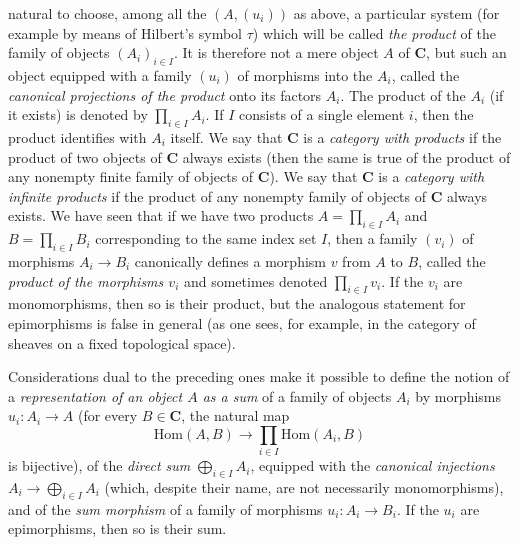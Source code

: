 
\noindent natural to choose, among all the $(A,(u_i))$ as above, a particular
system (for example by means of Hilbert's symbol $\tau$) which will be called
\textit{the product} of the family of objects $(A_i)_{i\in I}$. It is therefore
not a mere object $A$ of $\mathbf{C}$, but such an object equipped with a family $(u_i)$
of morphisms into the $A_i$, called the \textit{canonical projections of the
product} onto its factors $A_i$. The product of the $A_i$ (if it exists) is
denoted by $\displaystyle\prod_{i\in I}A_i$. If $I$ consists of a single element $i$, then
the product identifies with $A_i$ itself. We say that $\mathbf{C}$ is a
\textit{category with products} if the product of two objects of $\mathbf{C}$ always
exists (then the same is true of the product of any nonempty finite family of
objects of $\mathbf{C}$). We say that $\mathbf{C}$ is a \textit{category with infinite products}
if the product of any nonempty family of objects of $\mathbf{C}$ always exists. We have
seen that if we have two products $A=\displaystyle\prod_{i\in I}A_i$ and
$B=\displaystyle\prod_{i\in I}B_i$ corresponding to the same index set $I$, then a family
$(v_i)$ of morphisms $A_i\to B_i$ canonically defines a morphism
$v$ from $A$ to $B$, called the \textit{product of the morphisms $v_i$} and
sometimes denoted $\displaystyle\prod_{i\in I}v_i$. If the $v_i$ are monomorphisms, then so
is their product, but the analogous statement for epimorphisms is false in
general (as one sees, for example, in the category of sheaves on a fixed
topological space).

Considerations dual to the preceding ones make it possible to define the notion
of a \textit{representation of an object $A$ as a sum} of a family of objects
$A_i$ by morphisms $u_i:A_i\to A$ (for every $B\in \mathbf{C}$, the natural
map
\[
  \mathrm{Hom}(A,B)\to
  \prod_{i\in I}\mathrm{Hom}(A_i,B)
\]
is bijective), of the \textit{direct sum} $\displaystyle\bigoplus_{i\in I}A_i$, equipped
with the \textit{canonical injections}
$A_i\to\displaystyle\bigoplus_{i\in I}A_i$ (which, despite their name, are not
necessarily monomorphisms), and of the \textit{sum morphism} of a family of
morphisms $u_i:A_i\to B_i$. If the $u_i$ are epimorphisms, then so
is their sum.

